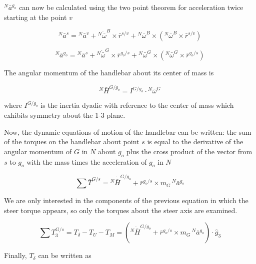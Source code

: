 \documentclass[a4paper]{article}
\begin{document}
$^N\bar{a}^{g_o}$ can now be calculated using the two point theorem for
acceleration \cite{Kane1985} twice starting at the point $v$

\begin{equation}
  ^N\bar{a}^s = {}^N\bar{a}^v +
    {}^N\dot{\bar{\omega}}^B\times\bar{r}^{s/v} +
    {}^N\bar{\omega}^B\times({}^N\bar{\omega}^B\times\bar{r}^{s/v})
\end{equation}

\begin{equation}
  ^N\bar{a}^{g_o} = {}^N\bar{a}^s +
    {}^N\dot{\bar{\omega}}^G\times\bar{r}^{g_o/s} +
    {}^N\bar{\omega}^G\times({}^N\bar{\omega}^G\times\bar{r}^{g_o/s})
\end{equation}

The angular momentum of the handlebar about its center of mass is

\begin{equation}
  ^N\bar{H}^{G/g_o} = I^{G/g_o} \cdot {}^N\bar{\omega}^G
\end{equation}

where $I^{G/g_o}$ is the inertia dyadic with reference to the center of
mass which exhibits symmetry about the 1-3 plane.

Now, the dynamic equations of motion of the handlebar can be written:
the sum of the torques on the handlebar about point $s$ is equal to the
derivative of the angular momentum of $G$ in $N$ about $g_o$ plus the
cross product of the vector from $s$ to $g_o$ with the mass times the
acceleration of $g_o$ in $N$ \cite{Meriam1975}

\begin{equation}
  \sum \bar{T}^{G/s} = {}^N\dot{\bar{H}}^{G/g_o} +
    \bar{r}^{g_o/s} \times m_G\,{}^N\bar{a}^{g_o}
\end{equation}

We are only interested in the components of the previous equation in
which the steer torque appears, so only the torques about the steer axis
are examined.

\begin{equation}
  \sum T^{G/s}_3 = T_\delta - T_U - T_M = \left({}^N\dot{\bar{H}}^{G/g_o} +
  \bar{r}^{g_o/s} \times m_G\,{}^N\bar{a}^{g_o}\right) \cdot \hat{g}_3
\end{equation}

Finally, $T_\delta$ can be written as
\end{document}
